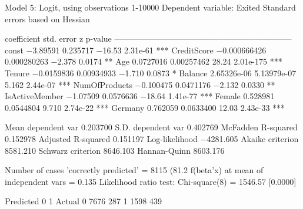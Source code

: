 Model 5: Logit, using observations 1-10000
Dependent variable: Exited
Standard errors based on Hessian

                   coefficient    std. error       z       p-value 
  -----------------------------------------------------------------
  const            −3.89591       0.235717      −16.53    2.31e-61  ***
  CreditScore      −0.000666426   0.000280263    −2.378   0.0174    **
  Age               0.0727016     0.00257462     28.24    2.01e-175 ***
  Tenure           −0.0159836     0.00934933     −1.710   0.0873    *
  Balance           2.65326e-06   5.13979e-07     5.162   2.44e-07  ***
  NumOfProducts    −0.100475      0.0471176      −2.132   0.0330    **
  IsActiveMember   −1.07509       0.0576636     −18.64    1.41e-77  ***
  Female            0.528981      0.0544804       9.710   2.74e-22  ***
  Germany           0.762059      0.0633400      12.03    2.43e-33  ***

Mean dependent var   0.203700   S.D. dependent var   0.402769
McFadden R-squared   0.152978   Adjusted R-squared   0.151197
Log-likelihood      −4281.605   Akaike criterion     8581.210
Schwarz criterion    8646.103   Hannan-Quinn         8603.176

Number of cases 'correctly predicted' = 8115 (81.2%
f(beta'x) at mean of independent vars = 0.135
Likelihood ratio test: Chi-square(8) = 1546.57 [0.0000]

           Predicted
               0      1
  Actual 0  7676    287
         1  1598    439
